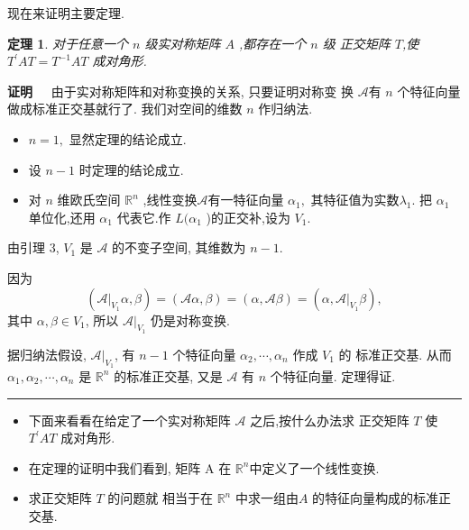 \documentclass[13pt]{beamer}
\newtheorem{thm}{定理}
\def\qed{\nopagebreak\hfill{\rule{4pt}{7pt}}\medbreak}
\def\pf{{\bf 证明~~ }}
\def\Rn{\mathbb{R}^n}
\def\A{\mathscr{A}}
\def\a{\alpha}
\def\b{\beta}
\begin{document}
\begin{frame}
现在来证明主要定理.
\begin{thm}
对于任意一个 $n$ 级实对称矩阵 $A$ ,都存在一个 $n$ 级 正交矩阵 $T$,使$T^{\prime}AT = T ^{-1} {A T}$ 成对角形. 
\end{thm}
\pf 
由于实对称矩阵和对称变换的关系, 只要证明对称变 换 $\A$有 $n$ 个特征向量做成标准正交基就行了. 我们对空间的维数 $n$ 作归纳法.
\begin{itemize}
\item $n=1,$ 显然定理的结论成立. 
\item 设 $n-1$ 时定理的结论成立.
\item 对 $n$ 维欧氏空间 $\Rn$ ,线性变换$\A$有一特征向量 ${\alpha}_{1},$ 其特征值为实数$\lambda_{1} .$  把 ${\alpha}_{1}$ 单位化,还用 ${\alpha}_{1}$
代表它.作 $L ( {\a}_{1}$ )的正交补,设为 $V_{1}.$ 
\end{itemize}

\end{frame}


\begin{frame}
由引理 3, $V_{1}$ 是 $\mathscr{A}$ 的不变子空间, 其维数为 $n-1$.

因为$$(\A|_{V_{1}} {\a}, {\beta})=(\A {\a}, {\beta})=({\alpha}, \A {\beta})=({\alpha}, \A|_{V_{1}} {\beta}),$$ 其中 $\a, \b \in V_1$, 所以 $\A|_{V_{1}}$ 仍是对称变换.

据归纳法假设, $\A|_{V_{1}}$, 有 $n-1$ 个特征向量 ${\alpha}_{2}, \cdots, {\alpha}_{n}$ 作成 $V_{1}$ 的
标准正交基.
从而 ${\alpha}_{1}, {\alpha}_{2}, \cdots, {\alpha}_{n}$ 是 $\mathbb{R}^{n}$ 的标准正交基, 又是 $\mathscr{A}$ 有
$n$ 个特征向量. 定理得证. 
\qed
\begin{itemize}
\item  下面来看看在给定了一个实对称矩阵 $\A$ 之后,按什么办法求 正交矩阵 $T$ 使$T^{\prime}AT$ 成对角形. 
\item  在定理的证明中我们看到, 矩阵 A 在 $\Rn$中定义了一个线性变换.
\item  求正交矩阵 $T$ 的问题就 相当于在 $\Rn$ 中求一组由$A$ 的\alert{特征向量}构成的标准正交基.
\end{itemize}
\end{frame}
\end{document}
